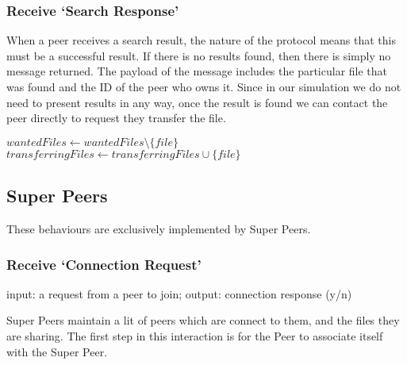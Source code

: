 \subsubsection{Receive `Search Response'}

When a peer receives a search result, the nature of the protocol means that this
must be a successful result. If there is no results found, then there is simply
no message returned.  The payload of the message includes the particular file
that was found and the ID of the peer who owns it.  Since in our simulation we
do not need to present results in any way, once the result is found we can
contact the peer directly to request they transfer the file.

\begin{algorithm}[H]

  $wantedFiles \leftarrow wantedFiles \setminus \{file\}$\;
  $transferringFiles \leftarrow transferringFiles \cup \{file\}$\;
\end{algorithm}


\subsection{Super Peers}

These behaviours are exclusively implemented by Super Peers.

\subsubsection{Receive `Connection Request'}
input: a request from a peer to join; output: connection response (y/n)

Super Peers maintain a lit of peers which are connect to them, and the files
they are sharing.  The first step in this interaction is for the Peer to
associate itself with the Super Peer.

\begin{algorithm}[H]

\end{algorithm}



